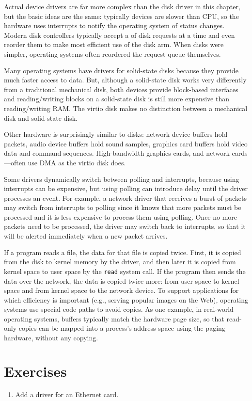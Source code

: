 Actual device drivers are far more complex than the disk driver in this chapter,
but the basic ideas are the same:
typically devices are slower than CPU, so the hardware uses
interrupts to notify the operating system of status changes.
Modern disk controllers typically
accept a 
of disk requests at a time and even reorder
them to make most efficient use of the disk arm.
When disks were simpler, operating systems often reordered the
request queue themselves.

Many operating systems have drivers for solid-state disks because they
provide much faster access to data.  But, although a solid-state disk
works very differently from a traditional mechanical disk, both
devices provide block-based interfaces and reading/writing blocks on a
solid-state disk is still more expensive than reading/writing RAM.
The virtio disk makes no distinction between a mechanical disk and
solid-state disk.

Other hardware is surprisingly similar to disks: network device
buffers hold packets, audio device buffers hold sound samples,
graphics card buffers hold video data and command sequences.
High-bandwidth graphics cards, and network cards—often use DMA
as the virtio disk does.

Some drivers dynamically switch between polling and interrupts, because using
interrupts can be expensive, but using polling can introduce delay until the
driver processes an event.  For example, a network driver that receives a
burst of packets may switch from interrupts to polling since it knows that more
packets must be processed and it is less expensive to process them using polling.
Once no more packets need to be processed, the driver may switch back to
interrupts, so that it will be alerted immediately when a new packet arrives.

If a program reads a file, the data for that file is copied twice.  First, it
is copied from the disk to kernel memory by the driver, and then later it is
copied from kernel space to user space by the 
\lstinline{read}
system call.  If the program then sends the data over the network, 
the data is copied twice more: from user space to kernel space and from
kernel space to the network device.  To support applications for which 
efficiency is important (e.g., serving popular images on the Web), operating systems
use special code paths to avoid copies.  As one example,
in real-world operating systems, 
buffers typically match the hardware page size, so that
read-only copies can be mapped into a process's address space
using the paging hardware, without any copying.

\section{Exercises}

\begin{enumerate}
  
\item Add a driver for an Ethernet card.

\end{enumerate}
